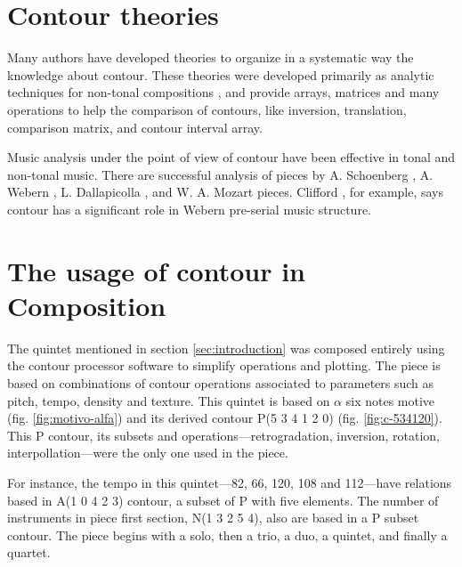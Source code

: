 \section{Contour theories}
\label{sec:contour-theories}

Many authors
\cite{friedmann85:methodology,friedmann87:response,morris87:composition,morris93:directions,marvin.ea87:relating,marvin88:generalized,marvin.ea95:generalization,polansky.ea92:possible,quinn97:fuzzy,clifford95:contour,beard03:contour}
have developed theories to organize in a systematic way the knowledge
about contour. These theories were developed primarily as analytic
techniques for non-tonal compositions \cite{beard03:contour}, and
provide arrays, matrices and many operations to help the comparison of
contours, like inversion, translation, comparison matrix, and contour
interval array.

Music analysis under the point of view of contour have been effective
in tonal and non-tonal music. There are successful analysis of pieces
by A. Schoenberg \cite{friedmann85:methodology}, A. Webern
\cite{clifford95:contour}, L. Dallapicolla
\cite{marvin88:generalized}, and W. A. Mozart \cite{beard03:contour}
pieces. Clifford \cite{clifford95:contour}, for example, says contour
has a significant role in Webern pre-serial music structure.

\section{The usage of contour in Composition}
\label{sec:contour-composition}

The quintet mentioned in section \ref{sec:introduction} was composed
entirely using the contour processor software to simplify operations
and plotting. The piece is based on combinations of contour operations
associated to parameters such as pitch, tempo, density and
texture. This quintet is based on $\alpha$ six notes motive
(fig. \ref{fig:motivo-alfa}) and its derived contour P(5 3 4 1 2 0)
(fig. \ref{fig:c-534120}). This P contour, its subsets and
operations---retrogradation, inversion, rotation,
interpollation---were the only one used in the piece.

For instance, the tempo in this quintet---82, 66, 120, 108 and
112---have relations based in A(1 0 4 2 3) contour, a subset of P with
five elements. The number of instruments in piece first section, N(1 3
2 5 4), also are based in a P subset contour. The piece begins with a
solo, then a trio, a duo, a quintet, and finally a quartet.

